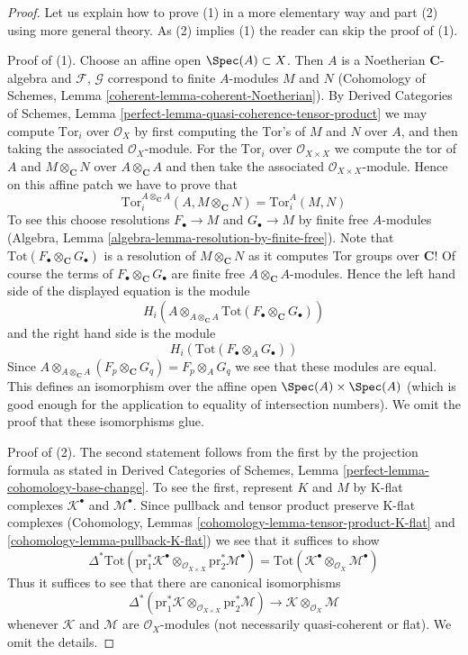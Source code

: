 \begin{proof}
Let us explain how to prove (1) in a more elementary way and part (2) using
more general theory. As (2) implies (1) the reader can skip the proof
of (1).

\medskip\noindent
Proof of (1). Choose an affine open $\Spec(A) \subset X$.
Then $A$ is a Noetherian $\mathbf{C}$-algebra and
$\mathcal{F}$, $\mathcal{G}$ correspond to finite $A$-modules
$M$ and $N$ (Cohomology of Schemes, Lemma
\ref{coherent-lemma-coherent-Noetherian}).
By Derived Categories of Schemes, Lemma
\ref{perfect-lemma-quasi-coherence-tensor-product} we may
compute $\text{Tor}_i$ over $\mathcal{O}_X$
by first computing the $\text{Tor}$'s
of $M$ and $N$ over $A$, and then taking the associated $\mathcal{O}_X$-module.
For the $\text{Tor}_i$ over $\mathcal{O}_{X \times X}$ we compute
the tor of $A$ and $M \otimes_\mathbf{C} N$ over $A \otimes_\mathbf{C} A$
and then take the associated $\mathcal{O}_{X \times X}$-module.
Hence on this affine patch we have to prove that
$$
\text{Tor}_i^{A \otimes_\mathbf{C} A}(A, M \otimes_\mathbf{C} N) =
\text{Tor}_i^A(M, N)
$$
To see this choose resolutions $F_\bullet \to M$ and $G_\bullet \to M$
by finite free $A$-modules
(Algebra, Lemma \ref{algebra-lemma-resolution-by-finite-free}).
Note that $\text{Tot}(F_\bullet \otimes_\mathbf{C} G_\bullet)$
is a resolution of $M \otimes_\mathbf{C} N$ as it computes
Tor groups over $\mathbf{C}$! Of course the terms of
$F_\bullet \otimes_\mathbf{C} G_\bullet$ are finite free
$A \otimes_\mathbf{C} A$-modules. Hence the left hand side
of the displayed equation is the module
$$
H_i(A \otimes_{A \otimes_\mathbf{C} A}
\text{Tot}(F_\bullet \otimes_\mathbf{C} G_\bullet))
$$
and the right hand side is the module
$$
H_i(\text{Tot}(F_\bullet \otimes_A G_\bullet))
$$
Since $A \otimes_{A \otimes_\mathbf{C} A} (F_p \otimes_\mathbf{C} G_q)
= F_p \otimes_A G_q$ we see that these modules are equal.
This defines an isomorphism over the affine open $\Spec(A) \times \Spec(A)$
(which is good enough for the application to equality of intersection numbers).
We omit the proof that these isomorphisms glue.

\medskip\noindent
Proof of (2). The second statement follows from the first by the
projection formula as stated in
Derived Categories of Schemes, Lemma \ref{perfect-lemma-cohomology-base-change}.
To see the first, represent $K$ and $M$ by K-flat complexes
$\mathcal{K}^\bullet$ and $\mathcal{M}^\bullet$.
Since pullback and tensor product preserve K-flat complexes
(Cohomology, Lemmas \ref{cohomology-lemma-tensor-product-K-flat} and
\ref{cohomology-lemma-pullback-K-flat})
we see that it suffices to show
$$
\Delta^*\text{Tot}(
\text{pr}_1^*\mathcal{K}^\bullet
\otimes_{\mathcal{O}_{X \times X}} \text{pr}_2^*\mathcal{M}^\bullet)
=
\text{Tot}(
\mathcal{K}^\bullet \otimes_{\mathcal{O}_X} \mathcal{M}^\bullet)
$$
Thus it suffices to see that there are canonical isomorphisms
$$
\Delta^*(\text{pr}_1^*\mathcal{K}
\otimes_{\mathcal{O}_{X \times X}} \text{pr}_2^*\mathcal{M})
\longrightarrow
\mathcal{K} \otimes_{\mathcal{O}_X} \mathcal{M}
$$
whenever $\mathcal{K}$ and $\mathcal{M}$ are $\mathcal{O}_X$-modules
(not necessarily quasi-coherent or flat).
We omit the details.
\end{proof}


